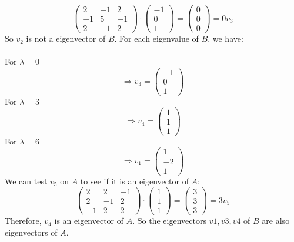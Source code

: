 \documentclass{article}
\begin{document}
\begin{equation*}
    \begin{pmatrix}
        2 & -1 & 2 \\
        -1 & 5 & -1 \\
        2 & -1 & 2 
    \end{pmatrix}
    \cdot
    \begin{pmatrix}
        -1 \\
        0 \\
        1
    \end{pmatrix}
    = 
    \begin{pmatrix}
        0 \\
        0 \\
        0
    \end{pmatrix}
    = 0v_3
\end{equation*}
So \(v_2\) is not a eigenvector of \(B\). For each eigenvalue of \(B\), we have:
\\ \\
For \(\lambda = 0\)
\[\Rightarrow v_3 = 
\begin{pmatrix}
    -1 \\
    0 \\
    1
\end{pmatrix}
\]
For \(\lambda = 3\)
\[\Rightarrow v_4 =
\begin{pmatrix}
    1 \\
    1 \\
    1
\end{pmatrix}
\]
For \(\lambda = 6\)
\[\Rightarrow v_1 =
\begin{pmatrix}
    1 \\
    -2 \\
    1
\end{pmatrix}
\]
We can test \(v_5\) on \(A\) to see if it is an eigenvector of \(A\):
\begin{equation*}
    \begin{pmatrix}
        2 & 2 & -1 \\
        2 & -1 & 2 \\
        -1 & 2 & 2
    \end{pmatrix}
    \cdot
    \begin{pmatrix}
        1 \\
        1 \\
        1
    \end{pmatrix}
    =
    \begin{pmatrix}
        3 \\
        3 \\
        3
    \end{pmatrix}
    = 3v_5
\end{equation*}
Therefore, \(v_4\) is an eigenvector of \(A\). So the eigenvectors \(v1, v3, v4\) of \(B\) are also eigenvectors of \(A\).
\end{document}

